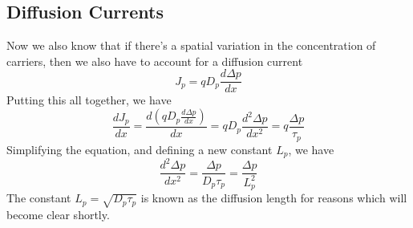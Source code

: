 \subsection{Diffusion Currents}
Now we also know that if there's a spatial variation in the concentration of carriers, then we also have to account for a diffusion current
    \begin{equation}
        J_p = q D_p \frac{d\Delta p}{dx}
    \end{equation}
Putting this all together, we have 
    \begin{equation}
        \frac{dJ_p}{dx}  = \frac{d(q D_p \frac{d\Delta p}{dx})}{dx} = q D_p \frac{d^2 \Delta  p}{dx^2} = q \frac{\Delta p}{\tau_p}
    \end{equation}
Simplifying the equation, and defining a new constant $L_p$, we have
    \begin{equation}
        \frac{d^2 \Delta p}{dx^2} =  \frac{\Delta p}{D_p \tau_p} =  \frac{\Delta p}{L_p^2}
        \label{eq:continuity}
    \end{equation}
The constant $L_p = \sqrt{D_p \tau_p}$ is known as the diffusion length for reasons which will become clear shortly.
